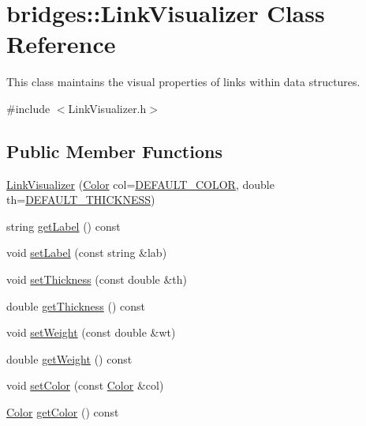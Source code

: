 \hypertarget{classbridges_1_1_link_visualizer}{}\section{bridges\+:\+:Link\+Visualizer Class Reference}
\label{classbridges_1_1_link_visualizer}


This class maintains the visual properties of links within data structures.  




{\ttfamily \#include $<$Link\+Visualizer.\+h$>$}

\subsection*{Public Member Functions}
\begin{DoxyCompactItemize}
\item 
\hyperlink{classbridges_1_1_link_visualizer_a598a773822efc55c644462795faf534f}{Link\+Visualizer} (\hyperlink{classbridges_1_1_color}{Color} col=\hyperlink{classbridges_1_1_link_visualizer_a7698ad5b243041377d81152a339d1282}{D\+E\+F\+A\+U\+L\+T\+\_\+\+C\+O\+L\+O\+R}, double th=\hyperlink{classbridges_1_1_link_visualizer_ab790c33080c769008114db34d5ec8950}{D\+E\+F\+A\+U\+L\+T\+\_\+\+T\+H\+I\+C\+K\+N\+E\+S\+S})
\item 
string \hyperlink{classbridges_1_1_link_visualizer_a6fa07a948f842530c0bb8a13f6e0e84a}{get\+Label} () const 
\item 
void \hyperlink{classbridges_1_1_link_visualizer_a7e590ad57c51ef16a1d46e05ffdf1fb3}{set\+Label} (const string \&lab)
\item 
void \hyperlink{classbridges_1_1_link_visualizer_a92a88e0e4c2f0c8c68f33578743c6502}{set\+Thickness} (const double \&th)
\item 
double \hyperlink{classbridges_1_1_link_visualizer_a22513552576c20a13d6fd81348abb815}{get\+Thickness} () const 
\item 
void \hyperlink{classbridges_1_1_link_visualizer_a08b606d2451026a11e110d0b94f97538}{set\+Weight} (const double \&wt)
\item 
double \hyperlink{classbridges_1_1_link_visualizer_a82b0992294de2dad264c32b33f9a87b7}{get\+Weight} () const 
\item 
void \hyperlink{classbridges_1_1_link_visualizer_adedc1f2b7d5d562b115ef9d8ae19fa73}{set\+Color} (const \hyperlink{classbridges_1_1_color}{Color} \&col)
\item 
\hyperlink{classbridges_1_1_color}{Color} \hyperlink{classbridges_1_1_link_visualizer_a4b244bde324fc61c262954e590db20a6}{get\+Color} () const 
\end{DoxyCompactItemize}
